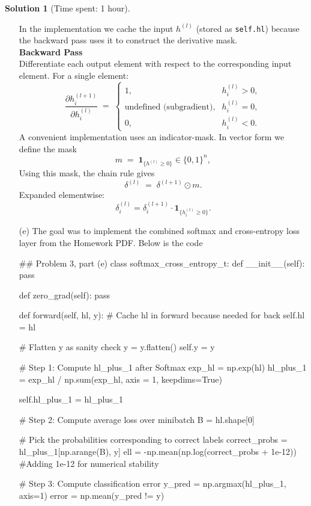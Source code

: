 \documentclass[11pt, reqno, letterpaper, twoside]{amsart}
\theoremstyle{plain}
\theoremstyle{definition}
\newtheorem{solution}[theorem]{Solution}
\begin{document}
\begin{solution}[Time spent: 1 hour]
\begin{enumerate}
In the implementation we cache the input $h^{(l)}$ (stored as \texttt{self.hl}) because the backward pass uses it to construct the derivative mask. \\

\noindent \textbf{Backward Pass} \\
Differentiate each output element with respect to the corresponding input element. For a single element:
\[
  \frac{\partial h^{(l+1)}_i}{\partial h^{(l)}_i}
  \;=\;
  \begin{cases}
    1, & h^{(l)}_i > 0,\\[4pt]
    \text{undefined (subgradient)}, & h^{(l)}_i = 0,\\[4pt]
    0, & h^{(l)}_i < 0.
  \end{cases}
\]
A convenient implementation uses an indicator-mask. In vector form we define the mask
\[
  m \;=\; \mathbf{1}_{\{h^{(l)} \ge 0\}} \in\{0,1\}^{n},
\]
Using this mask, the chain rule gives
\[
  \delta^{(l)} \;=\; \delta^{(l+1)} \odot m.
\]
Expanded elementwise:
\[
  \delta^{(l)}_i = \delta^{(l+1)}_i \cdot \mathbf{1}_{\{h^{(l)}_i \ge 0\}}.
\]

\newpage 

\item[(e)] The goal was to implement the combined softmax and cross-entropy loss layer from the Homework PDF. Below is the code 
\begin{python}
    ## Problem 3, part (e)
class softmax_cross_entropy_t:
    def __init__(self):
        pass

    def zero_grad(self):
        pass

    def forward(self, hl, y):
        # Cache hl in forward because needed for back
        self.hl = hl

        # Flatten y as sanity check 
        y = y.flatten()
        self.y = y

        # Step 1: Compute hl_plus_1 after Softmax
        exp_hl = np.exp(hl)
        hl_plus_1 = exp_hl / np.sum(exp_hl, axis = 1, keepdims=True)

        self.hl_plus_1 = hl_plus_1
        
        # Step 2: Compute average loss over minibatch 
        B = hl.shape[0]

        # Pick the probabilities corresponding to correct labels
        correct_probs = hl_plus_1[np.arange(B), y]
        ell = -np.mean(np.log(correct_probs + 1e-12)) #Adding 1e-12 for numerical stability

        # Step 3: Compute classification error 
        y_pred = np.argmax(hl_plus_1, axis=1)
        error = np.mean(y_pred != y)


\end{python}
\end{enumerate}
\end{solution}
\end{document}
